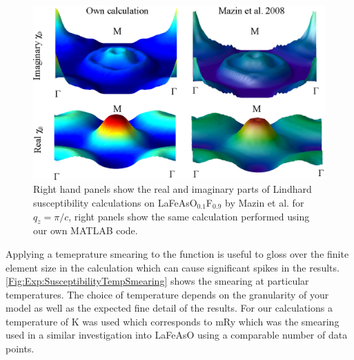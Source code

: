 \begin{figure}[htbp]
    \begin{center}
        \includegraphics[scale=0.9]{Chapter-dHvABaFe2P2/Figures/AngleDepMeasurements/SusceptibilityMazinComparison/SusceptibilityMazinComparison}
        \caption{Right hand panels show the real and imaginary parts of Lindhard susceptibility calculations on LaFeAsO$_{0.1}$F$_{0.9}$ by Mazin et al. for $q_z=\pi/c$, right panels show the same calculation performed using our own MATLAB code.}
        \label{Fig:Exp:MazinX0Comparison}
    \end{center}
\end{figure}

Applying a temeprature smearing to the function is useful to gloss over the finite element size in the calculation which can cause significant spikes in the results. \Fig\ref{Fig:Exp:SusceptibilityTempSmearing} shows the smearing at particular temperatures. The choice of temperature depends on the granularity of your model as well as the expected fine detail of the results. For our calculations a temperature of \unit[158]{K} was used which corresponds to \unit[1]{mRy} which was the smearing used in a similar investigation into LaFeAsO using a comparable number of data points\cite{Mazin2008}.

